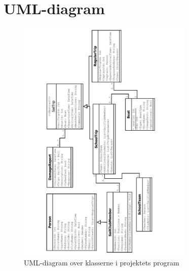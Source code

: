 \chapter{UML-diagram}\label{UML_diagram}

\begin{figure}[htbp]
  \centering
  \includegraphics[width=0.75\textwidth]{images/flowcharts/UML.pdf}
  \caption{UML-diagram over klasserne i projektets program}
  \label{fig:UML}
\end{figure}